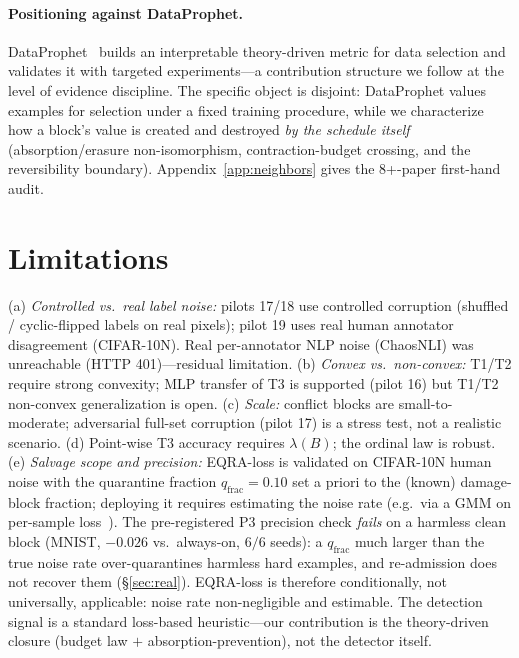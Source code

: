 \documentclass{article}
\newcommand{\B}{B}            %
\begin{document}
\paragraph{Positioning against DataProphet.} DataProphet~\citep{dataprophet2026} builds an
interpretable theory-driven metric for data selection and validates it with targeted
experiments---a contribution structure we follow at the level of evidence discipline. The
specific object is disjoint: DataProphet values examples for selection under a fixed training
procedure, while we characterize how a block's value is created and destroyed \emph{by the
schedule itself} (absorption/erasure non-isomorphism, contraction-budget crossing, and the
reversibility boundary). Appendix~\ref{app:neighbors} gives the 8+-paper first-hand audit.

\section{Limitations}
\label{sec:limitations}
(a) \emph{Controlled vs.\ real label noise:} pilots 17/18 use controlled corruption (shuffled /
cyclic-flipped labels on real pixels); pilot 19 uses real human annotator disagreement
(CIFAR-10N). Real per-annotator NLP noise (ChaosNLI) was unreachable (HTTP 401)---residual
limitation. (b) \emph{Convex vs.\ non-convex:} T1/T2 require strong convexity; MLP transfer of T3
is supported (pilot 16) but T1/T2 non-convex generalization is open. (c) \emph{Scale:} conflict
blocks are small-to-moderate; adversarial full-set corruption (pilot 17) is a stress test, not a
realistic scenario. (d) Point-wise T3 accuracy requires $\lambda(\B)$; the ordinal law is robust.
(e) \emph{Salvage scope and precision:} EQRA-loss is validated on CIFAR-10N human noise with the
quarantine fraction $q_{\text{frac}}{=}0.10$ set a priori to the (known) damage-block fraction;
deploying it requires estimating the noise rate (e.g.\ via a GMM on per-sample
loss~\citep{arazo2019unsupervised}). The pre-registered P3 precision check \emph{fails} on a
harmless clean block (MNIST, $-0.026$ vs.\ always-on, $6/6$ seeds): a $q_{\text{frac}}$ much
larger than the true noise rate over-quarantines harmless hard examples, and re-admission does
not recover them (\S\ref{sec:real}). EQRA-loss is therefore conditionally, not universally,
applicable: noise rate non-negligible and estimable. The detection signal is a standard
loss-based heuristic---our contribution is the theory-driven closure (budget law $+$
absorption-prevention), not the detector itself.
\end{document}
